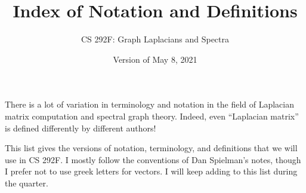 \documentclass[11pt]{article}
\begin{document}
\title{Index of Notation and Definitions}
\author{CS 292F: Graph Laplacians and Spectra}
\date{Version of May 8, 2021}
\maketitle

There is a lot of variation in terminology and notation in
the field of Laplacian matrix computation and spectral graph 
theory.  
Indeed, even ``Laplacian matrix'' is defined differently by
different authors!

This list gives the versions of notation, terminology, and definitions 
that we will use in CS 292F.
I mostly follow the conventions of Dan Spielman's notes, 
though I prefer not to use greek letters for vectors.
I will keep adding to this list during the quarter.
\end{document}
